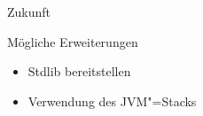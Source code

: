 \documentclass[hyperref={pdfpagelabels=false}]{beamer}
\begin{document}
\begin{frame}{Zukunft}
  \begin{block}{Mögliche Erweiterungen}
    \begin{itemize}
      \item Stdlib bereitstellen
      \item Verwendung des JVM"=Stacks
    \end{itemize}
  \end{block}
\end{frame}
\end{document}

